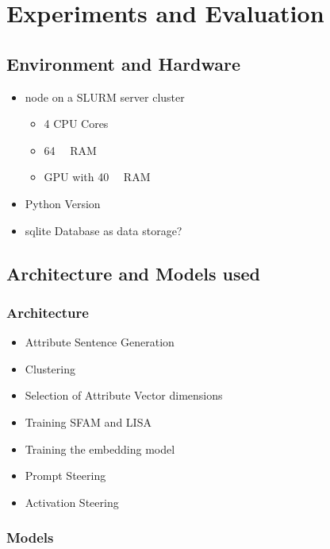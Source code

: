 \chapter{Experiments and Evaluation}
\label{sec:experiments_evaluation}


\section{Environment and Hardware}
\label{sec:experiments_evaluation:environmentHardware}

\begin{itemize}
  \item node on a SLURM server cluster
        \begin{itemize}
          \item 4 CPU Cores %
          \item \SI{64}{\giga\byte} RAM %
          \item GPU with \SI{40}{\giga\byte} RAM
        \end{itemize}
  \item Python Version
  \item sqlite Database as data storage?
\end{itemize}


\section{Architecture and Models used}
\label{sec:approach:architectureModels}

\subsection{Architecture}
\label{sec:approach:architectureModels:architecture}

\begin{itemize}
  \item Attribute Sentence Generation
  \item Clustering
  \item Selection of Attribute Vector dimensions
  \item Training SFAM and LISA
  \item Training the embedding model
  \item Prompt Steering
  \item Activation Steering
\end{itemize}

\subsection{Models}
\label{sec:approach:architectureModels:models}

